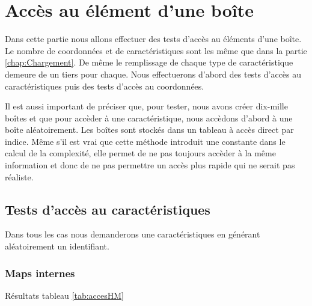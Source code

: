 \section{Accès au élément d'une boîte}
Dans cette partie nous allons effectuer des tests d'accès au éléments d'une boîte. Le nombre de coordonnées et de caractéristiques sont les même que dans la partie \ref{chap:Chargement}. De même le remplissage de chaque type de caractéristique demeure de un tiers pour chaque. Nous effectuerons d'abord des tests d'accès au caractéristiques puis des tests d'accès au coordonnées. 

Il est aussi important de préciser que, pour tester, nous avons créer dix-mille boîtes et que pour accèder à une caractéristique, nous accèdons d'abord à une boîte aléatoirement. Les boîtes sont stockés dans un tableau à accès direct par indice. Même s'il est vrai que cette méthode introduit une constante dans le calcul de la complexité, elle permet de ne pas toujours accèder à la même information et donc de ne pas permettre un accès plus rapide qui ne serait pas réaliste.

\subsection{Tests d'accès au caractéristiques}
Dans tous les cas nous demanderons une caractéristiques en générant aléatoirement un identifiant.

\subsubsection{Maps internes}
Résultats tableau \ref{tab:accesHM}
